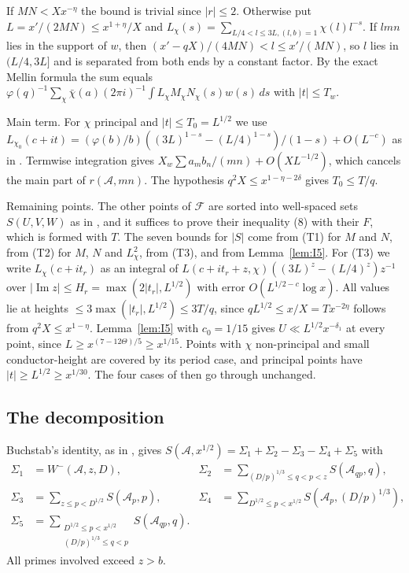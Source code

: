 \documentclass[11pt]{amsart}
\makeatletter
\theoremstyle{definition}
\numberwithin{equation}{section}
\renewenvironment{proof}[1][\proofname]{\par\pushQED{\qed}\normalfont\topsep6\p@\@plus6\p@\relax\trivlist\item[\hskip\labelsep\upshape#1.]\ignorespaces}{\popQED\endtrivlist\@endpefalse}
\newcommand{\cA}{\mathcal{A}}
\newcommand{\cF}{\mathcal{F}}
\makeatother
\begin{document}
\begin{proof}
If $MN<Xx^{-\eta}$ the bound is trivial since $|r|\le2$. Otherwise put $L=x'/(2MN)\le x^{1+\eta}/X$ and $L_\chi(s)=\sum_{L/4<l\le3L,(l,b)=1}\chi(l)l^{-s}$. If $lmn$ lies in the support of $w$, then $(x'-qX)/(4MN)<l\le x'/(MN)$, so $l$ lies in $(L/4,3L]$ and is separated from both ends by a constant factor. By the exact Mellin formula the sum equals $\varphi(q)^{-1}\sum_\chi\bar\chi(a)(2\pi i)^{-1}\int L_\chi M_\chi N_\chi(s)\hat w(s)\,ds$ with $|t|\le T_w$.

Main term. For $\chi$ principal and $|t|\le T_0=L^{1/2}$ we use $L_{\chi_0}(c+it)=(\varphi(b)/b)((3L)^{1-s}-(L/4)^{1-s})/(1-s)+O(L^{-c})$ as in \cite[p.~53]{HBI}. Termwise integration gives $X_w\sum a_mb_n/(mn)+O(XL^{-1/2})$, which cancels the main part of $r(\cA,mn)$. The hypothesis $q^2X\le x^{1-\eta-2\delta}$ gives $T_0\le T/q$.

Remaining points. The other points of $\cF$ are sorted into well-spaced sets $S(U,V,W)$ as in \cite[p.~54]{HBI}, and it suffices to prove their inequality (8) with their $F$, which is formed with $T$. The seven bounds for $|S|$ come from (T1) for $M$ and $N$, from (T2) for $M$, $N$ and $L_\chi^2$, from (T3), and from Lemma~\ref{lem:I5}. For (T3) we write $L_\chi(c+it_r)$ as an integral of $L(c+it_r+z,\chi)((3L)^z-(L/4)^z)z^{-1}$ over $|\operatorname{Im}z|\le H_r=\max(2|t_r|,L^{1/2})$ with error $O(L^{1/2-c}\log x)$. All values lie at heights $\le3\max(|t_r|,L^{1/2})\le3T/q$, since $qL^{1/2}\le x/X=Tx^{-2\eta}$ follows from $q^2X\le x^{1-\eta}$. Lemma~\ref{lem:I5} with $c_0=1/15$ gives $U\ll L^{1/2}x^{-\delta_1}$ at every point, since $L\ge x^{(7-12\Theta)/5}\ge x^{1/15}$. Points with $\chi$ non-principal and small conductor-height are covered by its period case, and principal points have $|t|\ge L^{1/2}\ge x^{1/30}$. The four cases of \cite[pp.~56--57]{HBI} then go through unchanged.
\end{proof}

\subsection{The decomposition}
Buchstab's identity, as in \cite[(4)]{HBI}, gives $S(\cA,x^{1/2})=\Sigma_1+\Sigma_2-\Sigma_3-\Sigma_4+\Sigma_5$ with
\begin{align*}
\Sigma_1&=W^-(\cA,z,D),&\Sigma_2&=\sum_{(D/p)^{1/3}\le q<p<z}S(\cA_{qp},q),\\
\Sigma_3&=\sum_{z\le p<D^{1/2}}S(\cA_p,p),&\Sigma_4&=\sum_{D^{1/2}\le p<x^{1/2}}S(\cA_p,(D/p)^{1/3}),\\
\Sigma_5&=\sum_{\substack{D^{1/2}\le p<x^{1/2}\\(D/p)^{1/3}\le q<p}}S(\cA_{qp},q).
\end{align*}
All primes involved exceed $z>b$.
\end{document}
